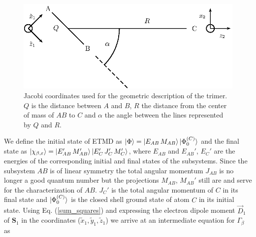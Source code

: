 \begin{figure}[ht]
\centering
%
\includegraphics[scale=1.00]{pics/coord_etmd_pspic.eps}
\caption{Jacobi coordinates used for the geometric description of the trimer.
        $Q$ is the distance between $A$ and $B$, $R$ the distance from the
        center of mass of $AB$ to $C$ and $\alpha$ the angle between the
        lines represented by $Q$ and $R$.}
\label{etmd_geom_pspic}
\end{figure}

We define the initial state of ETMD as
$\ket{\Phi} = \ket{E_{AB}\,  M_{AB}}\ket{\Phi_0^{(C)}}$ and the final state
as $\ket{\chi_{\beta,\varepsilon}} = \ket{E_{AB}'\, M_{AB}'}\ket{E_C'\,   J_C'\, M_C'}$,
where $E_{AB}$ and $E_{AB}'$, $E_C'$ are the energies of the corresponding
initial and final states of the subsystems. Since the subsystem $AB$ is of
linear symmetry the total angular momentum $J_{AB}$ is no longer a good
quantum number but the projections $M_{AB}$, $M_{AB}'$ still are and serve
for the characterization of $AB$. $J_C'$ is the total angular momentum of $C$
in its final state and $\ket{\Phi_0^{(C)}}$ is the closed shell ground
state of atom $C$ in its initial state. Using Eq. (\ref{sum_squares})
and expressing the electron dipole
moment $\vec{D}_1$ of $\mathbf{S}_1$ in the coordinates
($\tilde{x}_1,\tilde{y}_1,\tilde{z}_1$) we arrive at an intermediate equation
for $\Gamma_\beta$ as

